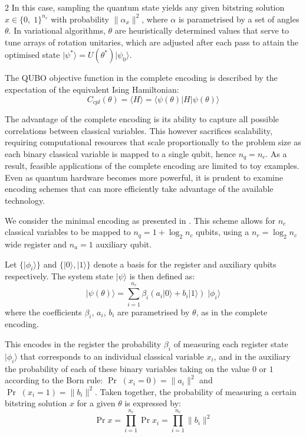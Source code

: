 \documentclass [10pt]{article}
\newcommand {\qvec}[1] {\vert #1 \rangle}
\newcommand {\qcovec}[1] {\langle #1 \vert}
\newcommand {\qeval}[1] {\langle #1 \rangle}
\newcommand {\qnorm}[1] {\lVert #1 \rVert}
\begin{document}
\begin {multicols}{2}
In this case, sampling the quantum state yields any given bitstring solution
${x \in \{0, \; 1\}^{n_c}}$ with probability $\qnorm{\alpha_x}^2$, where
$\alpha$ is parametrised by a set of angles $\theta$. In variational
algorithms, $\theta$ are heuristically determined values that serve to tune
arrays of rotation unitaries, which are adjusted after each pass to attain
the optimised state $\qvec{\psi^*} = U(\theta^*)\qvec{\psi_0}$.

The QUBO objective function in the complete encoding is described by the
expectation of the equivalent Ising Hamiltonian:
\begin {equation}
C_{cpl}(\theta) = \qeval{H} = \qcovec{\psi(\theta)} H \qvec{\psi(\theta)}
\end {equation}


The advantage of the complete encoding is its ability to capture all
possible correlations between classical variables. This however sacrifices
scalability, requiring computational resources that scale proportionally
to the problem size as each binary classical variable is mapped to a
single qubit, hence $n_q = n_c$. As a result, feasible applications of the
complete encoding are limited to toy examples. Even as quantum hardware
becomes more powerful, it is prudent to examine encoding schemes that can more
efficiently take advantage of the available technology.

We consider the minimal encoding as presented in \cite{effbinopt}. This scheme
allows for $n_c$ classical variables to be mapped to $n_q = 1 + \log_2 n_c$
qubits, using a $n_r = \log_2 n_c$ wide register and $n_a = 1$ auxiliary
qubit.

Let $\{\qvec{\phi_i}\}$ and $\{\qvec{0}, \qvec{1}\}$ denote a basis for the
register and auxiliary qubits respectively. The system state $\qvec{\psi}$ is
then defined as:
\begin {equation}
\qvec{\psi(\theta)} = \sum_{i=1}^{n_c} \beta_i
(a_i \qvec{0} + b_i \qvec{1}) \; \qvec{\phi_i}
\end {equation}
where the coefficients $\beta_i$, $a_i$, $b_i$ are parametrised by $\theta$,
as in the complete encoding.

This encodes in the register the probability $\beta_i$ of measuring each
register state $\qvec{\phi_i}$ that corresponds to an individual classical
variable $x_i$, and in the auxiliary the probability of each of these binary
variables taking on the value $0$ or $1$ according to the Born rule:
$\Pr \; (x_i = 0) = \qnorm{a_i}^2$ and $\Pr \; (x_i = 1) = \qnorm{b_i}^2$.
Taken together, the probability of measuring a certain bitstring solution
$x$ for a given $\theta$ is expressed by:
\begin {equation}
\label {prob}
\Pr x = \prod_{i=1}^{n_c} \Pr x_i = \prod_{i=1}^{n_c} \qnorm{b_i}^2
\end {equation}


\end{multicols}
\end{document}
